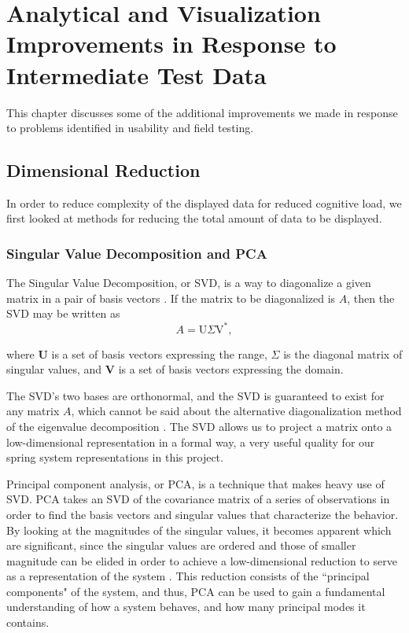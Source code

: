 
\chapter{Analytical and Visualization Improvements in Response to Intermediate Test Data}

This chapter discusses some of the additional improvements we made in response to problems identified in usability and field testing.

\section{Dimensional Reduction}

In order to reduce complexity of the displayed data for reduced cognitive load, we first looked at methods for reducing the total amount of data to be displayed.

\subsection{Singular Value Decomposition and PCA}

The Singular Value Decomposition, or SVD, is a way to diagonalize a given matrix in a pair of basis vectors \cite{kutz2013data}. If the matrix to be diagonalized is $A$, then the SVD may be written as
\begin{equation} \label{eq:svd}
A = \text{U} \Sigma \text{V}^{*},
\end{equation}

where \textbf{U} is a set of basis vectors expressing the range, $\Sigma$ is the diagonal matrix of singular values, and \textbf{V} is a set of basis vectors expressing the domain.

The SVD's two bases are orthonormal, and the SVD is guaranteed to exist for any matrix $A$, which cannot be said about the alternative diagonalization method of the eigenvalue decomposition \cite{datadriven}. The SVD allows us to project a matrix onto a low-dimensional representation in a formal way, a very useful quality for our spring system representations in this project.

Principal component analysis, or PCA, is a technique that makes heavy use of SVD. PCA takes an SVD of the covariance matrix of a series of observations in order to find the basis vectors and singular values that characterize the behavior. By looking at the magnitudes of the singular values, it becomes apparent which are significant, since the singular values are ordered and those of smaller magnitude can be elided in order to achieve a low-dimensional reduction to serve as a representation of the system \cite{kutz2013data}. This reduction consists of the ``principal components" of the system, and thus, PCA can be used to gain a fundamental understanding of how a system behaves, and how many principal modes it contains.


